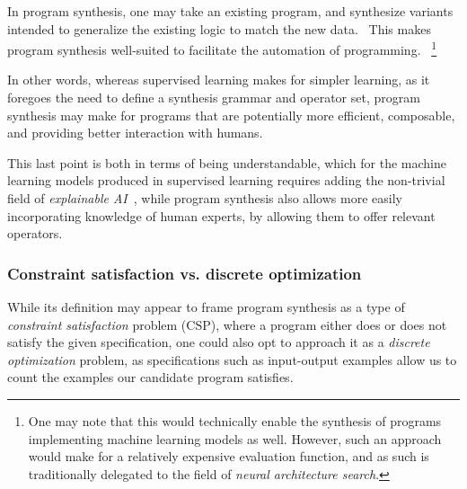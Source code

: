 \documentclass{article}
\begin{document}
In program synthesis, one may take an existing program, and synthesize variants intended to generalize the existing logic to match the new data.~\citep{myth}
This makes program synthesis well-suited to facilitate the automation of programming.%
~\footnote{
    One may note that this would technically enable the synthesis of programs implementing machine learning models as well.
    However, such an approach would make for a relatively expensive evaluation function,
    and as such is traditionally delegated to the field of \emph{neural architecture search}.
}

In other words, whereas supervised learning makes for simpler learning,
as it foregoes the need to define a synthesis grammar and operator set,
program synthesis may make for programs that are potentially more efficient,
composable,
and providing better interaction with humans.

This last point is both in terms of being understandable,
which for the machine learning models produced in supervised learning requires adding the non-trivial field of \emph{explainable AI}~\citep{gunning2017explainable},
while program synthesis also allows more easily incorporating knowledge of human experts,
by allowing them to offer relevant operators.

\subsubsection{Constraint satisfaction vs. discrete optimization}

While its definition may appear to frame program synthesis as a type of \emph{constraint satisfaction} problem (CSP),
where a program either does or does not satisfy the given specification,
one could also opt to approach it as a \emph{discrete optimization} problem,
as specifications such as input-output examples allow us to count the examples our candidate program satisfies.
\end{document}
